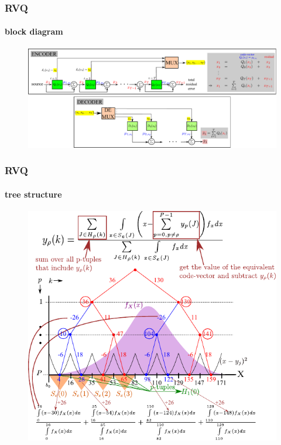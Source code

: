 \begin{frame}[plain]
\frametitle{RVQ}
\framesubtitle{block diagram}
\logoCSIPCPL\mypagenum
	\begin{changemargin}{-1.3in}{0in}
		\begin{figure}				
			\includegraphics[width=1.3\textwidth]{figs/RVQ_blockDiagram.pdf}
		\end{figure}
	\end{changemargin}
\end{frame}





\begin{frame}
\frametitle{RVQ}
\framesubtitle{tree structure}
\logoCSIPCPL\mypagenum
	\begin{figure}				
		\includegraphics[width=1.0\textwidth]{figs/RVQ_stagewise_example.pdf}
	\end{figure}
\end{frame}




